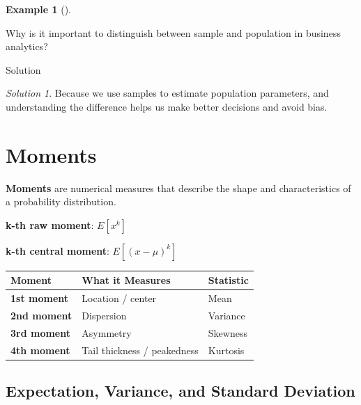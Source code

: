 \documentclass[
  12pt,
  letterpaper,
]{scrbook}
\theoremstyle{plain}
\theoremstyle{definition}
\newtheorem{example}{Example}[chapter]
\theoremstyle{remark}
\newtheorem{refsolution}{Solution}[chapter]
\begin{document}
\begin{example}[]\protect\hypertarget{exm-3}{}\label{exm-3}

Why is it important to distinguish between sample and population in
business analytics?

\end{example}

Solution

\begin{refsolution}
\leavevmode

Because we use samples to estimate population parameters, and
understanding the difference helps us make better decisions and avoid
bias.

\label{sol-3}

\end{refsolution}

\section{Moments}\label{moments}

\textbf{Moments} are numerical measures that describe the shape and
characteristics of a probability distribution.

\textbf{k-th raw moment}: \(E[x^k]\)

\textbf{k-th central moment}: \(E[(x-\mu)^k]\)

\begin{longtable}[]{@{}lll@{}}
\toprule\noalign{}
Moment & What it Measures & Statistic \\
\midrule\noalign{}
\endhead
\bottomrule\noalign{}
\endlastfoot
\textbf{1st moment} & Location / center & Mean \\
\textbf{2nd moment} & Dispersion & Variance \\
\textbf{3rd moment} & Asymmetry & Skewness \\
\textbf{4th moment} & Tail thickness / peakedness & Kurtosis \\
\end{longtable}

\subsection{Expectation, Variance, and Standard
Deviation}\label{expectation-variance-and-standard-deviation}
\end{document}
